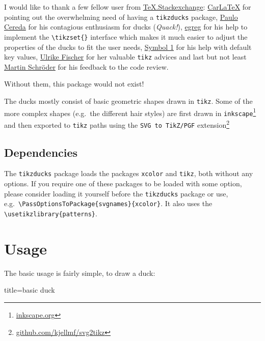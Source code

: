 \documentclass{scrartcl}
\newcommand{\tikzducks}{\texttt{tikzducks}\xspace}
\begin{document}
I would like to thank a few fellow user from \href{https://tex.stackexchange.com/}{TeX.Stackexchange}: \href{https://tex.stackexchange.com/users/101651/carlatex}{CarLaTeX} for pointing out the overwhelming need of having a \tikzducks package,
\href{https://tex.stackexchange.com/users/3094/paulo-cereda}{Paulo Cereda} for his contagious enthusiasm for ducks (\emph{Quack!}),
\href{https://tex.stackexchange.com/users/4427/egreg}{egreg} for his help to implement the \verb|\tikzset{}| interface which makes it much easier to adjust the properties of the ducks to fit the user needs, \href{https://tex.stackexchange.com/users/51022/symbol-1}{Symbol 1} for his help with default key values, \href{https://tex.stackexchange.com/users/2388/ulrike-fischer}{Ulrike Fischer} for her valuable \texttt{tikz} advices and last but not least \href{https://tex.stackexchange.com/users/5763/martin-schr%c3%b6der}{Martin Schr\"oder} for his feedback to the code review.

\bigskip\noindent
Without them, this package would not exist!

The ducks mostly consist of basic geometric shapes drawn in \texttt{tikz}. Some of the more complex shapes (e.g.\ the different hair styles) are first drawn in \texttt{inkscape}\footnote{\url{inkscape.org}} and then exported to \texttt{tikz} paths using the \texttt{SVG to TikZ/PGF} extension\footnote{\url{github.com/kjellmf/svg2tikz}}

\subsection{Dependencies}

The \tikzducks package loads the packages \texttt{xcolor} and \texttt{tikz}, both without any options. If you require one of these packages to be loaded with some option, please consider loading it yourself before the \tikzducks package or use, e.g.\ \verb|\PassOptionsToPackage{svgnames}{xcolor}|.
It also uses the \verb|\usetikzlibrary{patterns}|.

\section{Usage}

The basic usage is fairly simple, to draw a duck:
\begin{tcblisting}{title={basic duck}}
\begin{tikzpicture}
	\duck
\end{tikzpicture}
\end{tcblisting}
\end{document}
